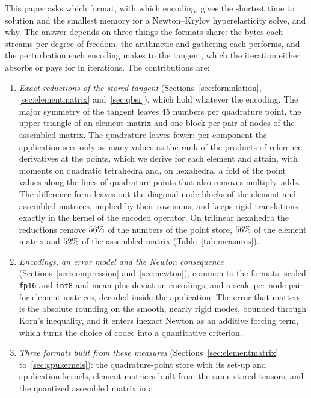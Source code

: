 \documentclass[sigconf,balance=false]{acmart}
\begin{document}
This paper asks which format, with which encoding, gives the shortest time to solution and the
smallest memory for a Newton--Krylov hyperelasticity solve, and why.  The answer depends on three
things the formats share: the bytes each streams per degree of freedom, the arithmetic and gathering
each performs, and the perturbation each encoding makes to the tangent, which the iteration either
absorbs or pays for in iterations.  The contributions are:

\begin{enumerate}[leftmargin=1.5em,itemsep=2pt]
\item \emph{Exact reductions of the stored tangent} (Sections~\ref{sec:formulation},
  \ref{sec:elementmatrix} and~\ref{sec:qbsr}), which hold whatever the encoding.  The major symmetry
  of the tangent leaves $45$ numbers per quadrature point, the upper triangle of an element matrix
  and one block per pair of nodes of the assembled matrix.  The quadrature leaves fewer: per
  component the application sees only as many values as the rank of the products of reference
  derivatives at the points, which we derive for each element and attain, with moments on quadratic
  tetrahedra and, on hexahedra, a fold of the point values along the lines of quadrature points that
  also removes multiply--adds.  The difference form leaves out the diagonal node blocks of the
  element and assembled matrices, implied by their row sums, and keeps rigid translations exactly in
  the kernel of the encoded operator.  On trilinear hexahedra the reductions remove
  $56\%$ of the numbers of the point store, $56\%$ of the element
  matrix and $52\%$ of the assembled matrix (Table~\ref{tab:measures}).
\item \emph{Encodings, an error model and the Newton consequence} (Sections~\ref{sec:compression}
  and~\ref{sec:newton}), common to the formats: scaled \texttt{fp16} and \texttt{int8} and
  mean-plus-deviation encodings, and a scale per node pair for element matrices, decoded inside the
  application.  The error that matters is the absolute rounding on the smooth, nearly rigid modes,
  bounded through Korn's inequality, and it enters inexact Newton as an additive forcing term, which
  turns the choice of codec into a quantitative criterion.
\item \emph{Three formats built from these measures} (Sections~\ref{sec:elementmatrix}
  to~\ref{sec:gpukernels}): the quadrature-point store with its set-up and application kernels, element
  matrices built from the same stored tensors, and the quantized assembled matrix in a

\end{enumerate}
\end{document}
